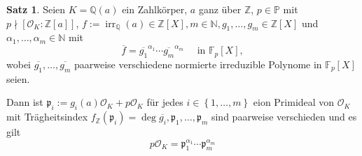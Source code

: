 \documentclass[
twoside=semi,
fontsize=12,
DIV=12, 
cleardoublepage=current,
leqno,
headings=optiontoheadandtoc, 
toc=idx
]{scrbook}
\newcommand{\N}{\mathbb{N}}
\newcommand{\Z}{\mathbb{Z}}
\newcommand{\Q}{\mathbb{Q}}
\newcommand{\F}{\mathbb{F}}
\renewcommand{\P}{\mathbb{P}}
\newcommand{\set}[1]{\left\{ #1 \right\}}
\DeclareMathOperator{\irr}{irr}
\theoremstyle{definition}
\newtheorem{satz}[definition]{Satz}
\begin{document}
	\begin{satz}\label{3.2.2}\hfill\newline
		Seien $K = \Q(a)$ ein Zahlk\"orper, $a$ ganz \"uber $\Z$, $p \in \P$ mit $p\nmid [\mathcal{O}_K:\Z[a]]$, \linebreak $f:= \irr_\Q(a) \in \Z[X], m \in \N, g_1, \dots, g_m \in \Z[X]$ und $\alpha_1, \dots, \alpha_m \in \N$ mit
			\[\overline{f} = \overline{g_1}^{\alpha_1} \cdots \overline{g_m}^{\alpha_m} \quad \textrm{ in } \F_p[X],\]
		wobei $\overline{g_1}, \dots, \overline{g_m}$ paarweise verschiedene normierte irreduzible Polynome in $\F_p[X]$ seien.
		
		\medskip\noindent
		Dann ist $\mathfrak{p}_i := g_i(a)\mathcal{O}_K + p\mathcal{O}_K$ f\"ur jedes $i \in \set{1, \dots, m}$ eion Primideal von $\mathcal{O}_K$ mit Tr\"agheitsindex $f_\Z(\mathfrak{p}_i) = \deg \overline{g_i}, \mathfrak{p}_1, \dots, \mathfrak{p}_m$ sind paarweise verschieden und es gilt 
			\[p\mathcal{O}_K = \mathfrak{p}_1^{\alpha_1} \cdots \mathfrak{p}_m^{\alpha_m}\]
		

\end{satz}
\end{document}
